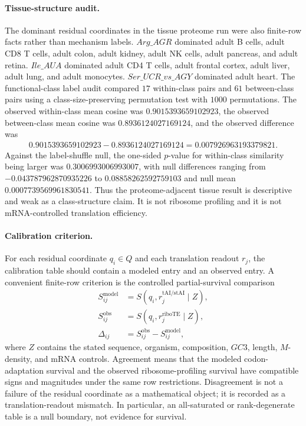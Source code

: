 \paragraph{Tissue-structure audit.}
The dominant residual coordinates in the tissue proteome run were also finite-row facts rather than mechanism labels.  $Arg\_AGR$ dominated adult B cells, adult CD8 T cells, adult colon, adult kidney, adult NK cells, adult pancreas, and adult retina.  $Ile\_AUA$ dominated adult CD4 T cells, adult frontal cortex, adult liver, adult lung, and adult monocytes.  $Ser\_UCR\_vs\_AGY$ dominated adult heart.  The functional-class label audit compared $17$ within-class pairs and $61$ between-class pairs using a class-size-preserving permutation test with $1000$ permutations.  The observed within-class mean cosine was $0.9015393659102923$, the observed between-class mean cosine was $0.8936124027169124$, and the observed difference was
$$
\begin{aligned}
0.9015393659102923-0.8936124027169124=0.007926963193379821.
\end{aligned}
$$
Against the label-shuffle null, the one-sided $p$-value for within-class similarity being larger was $0.3006993006993007$, with null differences ranging from $-0.043787962870935226$ to $0.08858262592759103$ and null mean $0.0007739569961830541$.  Thus the proteome-adjacent tissue result is descriptive and weak as a class-structure claim.  It is not ribosome profiling and it is not mRNA-controlled translation efficiency.

\paragraph{Calibration criterion.}
For each residual coordinate $q_i\in Q$ and each translation readout $r_j$, the calibration table should contain a modeled entry and an observed entry.  A convenient finite-row criterion is the controlled partial-survival comparison
$$
\begin{aligned}
S^{\mathrm{model}}_{ij} &= S(q_i,r^{\mathrm{tAI/stAI}}_j\mid Z),\\
S^{\mathrm{obs}}_{ij} &= S(q_i,r^{\mathrm{riboTE}}_j\mid Z),\\
\Delta_{ij} &= S^{\mathrm{obs}}_{ij}-S^{\mathrm{model}}_{ij},
\end{aligned}
$$
where $Z$ contains the stated sequence, organism, composition, $GC3$, length, $M$-density, and mRNA controls.  Agreement means that the modeled codon-adaptation survival and the observed ribosome-profiling survival have compatible signs and magnitudes under the same row restrictions.  Disagreement is not a failure of the residual coordinate as a mathematical object; it is recorded as a translation-readout mismatch.  In particular, an all-saturated or rank-degenerate table is a null boundary, not evidence for survival.

